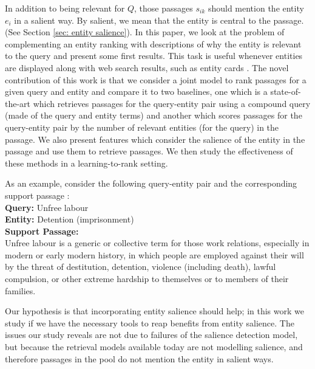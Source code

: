 \documentclass[sigconf]{acmart}
\begin{document}
In addition to being relevant for $Q$, those passages $s_{ik}$ should mention the entity $e_i$ in a salient way. By salient, we mean that the entity is central to the passage. (See Section \ref{sec: entity salience}).
In this paper, we look at the problem of complementing an entity ranking with descriptions of why the entity is relevant to the query and present some first results. This task is useful whenever entities are displayed along with web search results, such as entity cards \cite{berntson2012providing}. The novel contribution of this work is that we consider a joint model to rank passages for a given query and entity and compare it to two baselines, one which is a state-of-the-art which retrieves passages for the query-entity pair using a compound query (made of the query and entity terms) and another which scores passages for the query-entity pair by the number of relevant entities (for the query) in the passage. We also present features which consider the salience of the entity in the passage and use them to retrieve passages. We then study the effectiveness of these methods in a learning-to-rank \cite{liu2009learning} setting.

As an example, consider the following query-entity pair and the corresponding support passage : \\
\textbf{Query: } Unfree labour \\
\textbf{Entity: } Detention (imprisonment) \\
\textbf{Support Passage: } \\
Unfree labour is a generic or collective term for those work relations, especially in modern or early modern history, in which people are employed against their will by the threat of destitution, detention, violence (including death), lawful compulsion, or other extreme hardship to themselves or to members of their families.

Our hypothesis is that incorporating entity salience should help; in this work we study if we have the necessary tools to reap benefits from entity salience. The issues our study reveals are not due to failures of the salience detection model, but because the retrieval models available today are not modelling salience, and therefore passages in the pool do not mention the entity in salient ways. 
\end{document}
